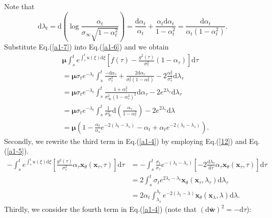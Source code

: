 Note that
\begin{equation}
\mathrm{d}\lambda_t=\mathrm{d}\left(\log{\frac{\alpha_t}{\sigma_\infty\sqrt{1-\alpha_t^2}}}\right)
=\frac{\mathrm{d}\alpha_t}{\alpha_t}+\frac{\alpha_t\mathrm{d}\alpha_t}{1-\alpha_t^2}=\frac{\mathrm{d}\alpha_t}{\alpha_t(1-\alpha_t^2)}.
\label{a1-7}
\end{equation}
Substitute Eq.(\ref{a1-7}) into Eq.(\ref{a1-6}) and we obtain
\begin{align}
&\boldsymbol\mu\int_s^te^{\int_\tau^tu(\xi)\mathrm{d}\xi}\left[f(\tau)-\frac{g^2(\tau)}{\sigma^2_\tau}(1-\alpha_\tau)\right]\mathrm{d}\tau \nonumber\\
&=\boldsymbol\mu\sigma_te^{-\lambda_t}\int_s^t\frac{-\mathrm{d}\alpha_\tau}{\sigma^2_\tau}
+\frac{2\mathrm{d}\alpha_\tau}{\sigma^2_\tau(1-\alpha^2_\tau)}
-2\frac{\alpha^2_\tau}{\sigma^2_\tau}\mathrm{d}\lambda_\tau \nonumber\\
&=\boldsymbol\mu\sigma_te^{-\lambda_t}\int_s^t\frac{1+\alpha^2_\tau}{\sigma^2_\infty(1-\alpha^2_\tau)^2}\mathrm{d}\alpha_\tau
-2e^{2\lambda_\tau}\mathrm{d}\lambda_\tau \nonumber\\
&=\boldsymbol\mu\sigma_te^{-\lambda_t}\int_s^t\frac{1}{\sigma^2_\infty}\mathrm{d}\left(\frac{\alpha_\tau}{1-\alpha^2_\tau}\right)
-2e^{2\lambda_\tau}\mathrm{d}\lambda \nonumber\\
&=\boldsymbol\mu\left(1-\frac{\alpha_t}{\alpha_s}e^{-2(\lambda_t-\lambda_s)}-\alpha_t+\alpha_te^{-2(\lambda_t-\lambda_s)}\right).
\label{a1-8}
\end{align}
Secondly, we rewrite the third term in Eq.(\ref{a1-4}) by employing Eq.(\ref{12}) and Eq.(\ref{a1-5}).
\begin{align}
-\int_s^te^{\int_\tau^tu(\xi)\mathrm{d}\xi}\left[\frac{g^2(\tau)}{\sigma^2_\tau}\alpha_\tau\boldsymbol{x}_\theta(\boldsymbol{x}_\tau,\tau)\right]\mathrm{d}\tau
&=-\int_s^t\frac{\sigma_t}{\sigma_\tau}e^{-(\lambda_t-\lambda_\tau)}\left[-2\frac{\mathrm{d}\lambda_\tau}{\mathrm{d}\tau}\alpha_\tau\boldsymbol{x}_\theta(\boldsymbol{x}_\tau,\tau)\right]\mathrm{d}\tau \nonumber\\
&=2\int_s^t \sigma_te^{2\lambda_\tau-\lambda_t}\boldsymbol{x}_\theta(\boldsymbol{x}_\tau,\lambda_\tau)\mathrm{d}\lambda_\tau \nonumber\\
&=2\alpha_t\int_{\lambda_s}^{\lambda_t}e^{-2(\lambda_t-\lambda)}\boldsymbol{x}_\theta(\boldsymbol{x}_\lambda,\lambda)\mathrm{d}\lambda.
\label{a1-9}
\end{align}
Thirdly, we consider the fourth term in Eq.(\ref{a1-4}) (note that $(\mathrm{d}\bar{\boldsymbol{w}})^2=-\mathrm{d}\tau$):
